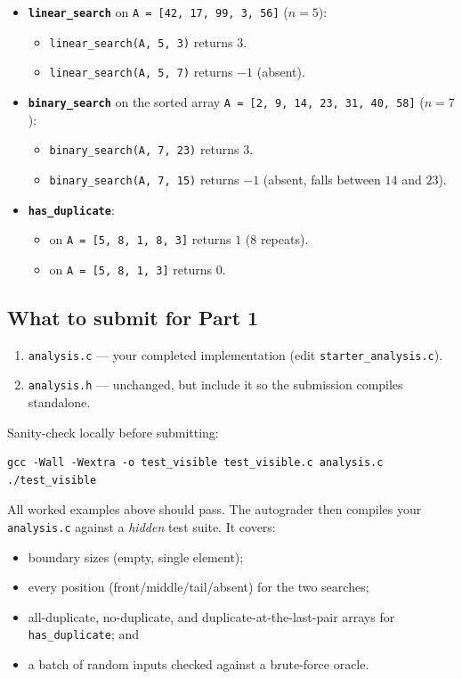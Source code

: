 \documentclass[11pt]{article}
\begin{document}
\begin{itemize}
  \item \textbf{\texttt{linear\_search}} on \texttt{A = [42, 17, 99, 3, 56]} ($n = 5$):
  \begin{itemize}
    \item \texttt{linear\_search(A, 5, 3)} returns $3$.
    \item \texttt{linear\_search(A, 5, 7)} returns $-1$ (absent).
  \end{itemize}
  \item \textbf{\texttt{binary\_search}} on the sorted array \texttt{A = [2, 9, 14, 23, 31, 40, 58]} ($n = 7$):
  \begin{itemize}
    \item \texttt{binary\_search(A, 7, 23)} returns $3$.
    \item \texttt{binary\_search(A, 7, 15)} returns $-1$ (absent, falls between $14$ and $23$).
  \end{itemize}
  \item \textbf{\texttt{has\_duplicate}}:
  \begin{itemize}
    \item on \texttt{A = [5, 8, 1, 8, 3]} returns $1$ ($8$ repeats).
    \item on \texttt{A = [5, 8, 1, 3]} returns $0$.
  \end{itemize}
\end{itemize}

\subsection{What to submit for Part 1}

\begin{enumerate}
  \item \texttt{analysis.c} --- your completed implementation (edit \texttt{starter\_analysis.c}).
  \item \texttt{analysis.h} --- unchanged, but include it so the submission compiles standalone.
\end{enumerate}

Sanity-check locally before submitting:
\begin{verbatim}
gcc -Wall -Wextra -o test_visible test_visible.c analysis.c
./test_visible
\end{verbatim}
All worked examples above should pass. The autograder then compiles your \texttt{analysis.c} against a \emph{hidden} test suite. It covers:
\begin{itemize}
  \item boundary sizes (empty, single element);
  \item every position (front/middle/tail/absent) for the two searches;
  \item all-duplicate, no-duplicate, and duplicate-at-the-last-pair arrays for \texttt{has\_duplicate}; and
  \item a batch of random inputs checked against a brute-force oracle.
\end{itemize}
\end{document}
